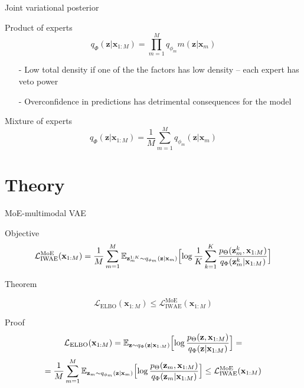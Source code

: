 \documentclass{beamer}
\begin{document}
\begin{frame}{Joint variational posterior}
 \begin{block}{Product of experts}
    $$q_\Phi (\textbf{z}| \textbf{x}_{1:M}) = \prod\limits_{m=1}^M q_{\phi_m} m(\textbf{z}| \textbf{x}_m)$$

    \begin{itemize}
        \item[-] Low total density if one of the the factors has low density -- each expert has veto power
        \item[-] Overconfidence in predictions has detrimental consequences for the model
    \end{itemize}
    
\end{block}

\begin{block}{Mixture of experts}
    $$q_\Phi(\textbf{z}| \textbf{x}_{1:M}) = \dfrac1M \sum\limits_{m=1}^M q_{\phi_m} (\textbf{z}| \textbf{x}_m)$$

\end{block}

\end{frame}

\section{Theory}
\begin{frame}{MoE-multimodal VAE}
    \begin{block}{Objective}
    $$\mathcal{L}_\text{IWAE}^\text{MoE} (\textbf{x}_{1:M}) = \dfrac1M \sum\limits_{m=1}^M \mathbb{E}_{\textbf{z}^{1:K}_m \sim q_{\phi_m} (\textbf{z} | \textbf{x}_{m})} \Bigl[ \log \dfrac1K  \sum\limits_{k=1}^K \dfrac{p_\Theta(\textbf{z}^k_m, \textbf{x}_{1:M})}{q_\Phi (\textbf{z}^k_m | \textbf{x}_{1:M})} \Bigr] $$

    \end{block}    

    \begin{block}{Theorem}

    $$\mathcal{L}_\text{ELBO} (\textbf{x}_{1:M}) \le \mathcal{L}_\text{IWAE}^\text{MoE} (\textbf{x}_{1:M})$$
    
    \end{block}

    \begin{block}{Proof}
    $$\mathcal{L}_\text{ELBO} (\textbf{x}_{1:M}) = \mathbb{E}_{\textbf{z}\sim q_\Phi (\textbf{z}| \textbf{x}_{1: M})} \Bigl[ \log \dfrac{p_\Theta(\textbf{z}, \textbf{x}_{1:M})}{q_\Phi (\textbf{z} | \textbf{x}_{1:M})} \Bigr] =  $$ $$=\dfrac1M \sum\limits_{m=1}^M \mathbb{E}_{\textbf{z}_m \sim q_{\phi_m} (\textbf{z}| \textbf{x}_{m})} \Bigl[ \log \dfrac{p_\Theta(\textbf{z}_m, \textbf{x}_{1:M})}{q_\Phi (\textbf{z}_m | \textbf{x}_{1:M})} \Bigr] \le \mathcal{L}_\text{IWAE}^\text{MoE} (\textbf{x}_{1:M})$$

    \end{block}
    
\end{frame}
\end{document}
